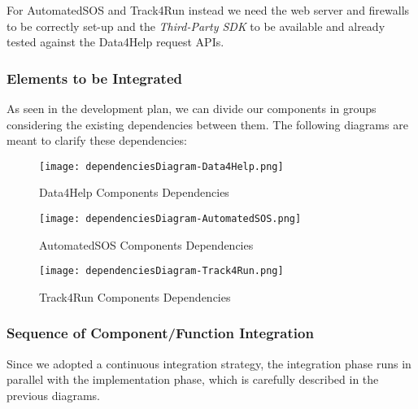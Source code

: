 For AutomatedSOS and Track4Run instead we need the web server and firewalls to be correctly set-up and the \textit{Third-Party SDK} to be available and already tested against the Data4Help request APIs.

\subsubsection{Elements to be Integrated}
As seen in the development plan, we can divide our components in groups considering the existing dependencies between them. The following diagrams are meant to clarify these dependencies:

\FloatBarrier
\begin{figure}[!h]
	\centering
	\texttt{[image: dependenciesDiagram-Data4Help.png]}
	\caption{Data4Help Components Dependencies}
\end{figure}
\FloatBarrier

\FloatBarrier
\begin{figure}[!h]
	\centering
	\texttt{[image: dependenciesDiagram-AutomatedSOS.png]}
	\caption{AutomatedSOS Components Dependencies}
\end{figure}
\FloatBarrier

\FloatBarrier
\begin{figure}[!h]
	\centering
	\texttt{[image: dependenciesDiagram-Track4Run.png]}
	\caption{Track4Run Components Dependencies}
\end{figure}
\FloatBarrier

\subsubsection{Sequence of Component/Function Integration}
Since we adopted a continuous integration strategy, the integration phase runs in parallel  with the implementation phase, which is carefully described in the previous diagrams.
